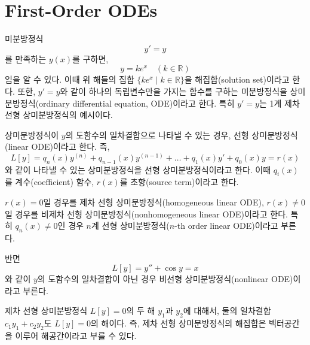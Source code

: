 \documentclass[../engineering_mathematics_lecture_note.tex]{subfiles}
\begin{document}
\section{First-Order ODEs}
미분방정식
\begin{equation*}
    y' = y
\end{equation*}
를 만족하는 $y(x)$를 구하면,
\begin{equation*}
    y = ke^x \quad (k \in \mathbb R)
\end{equation*}
임을 알 수 있다.
이때 위 해들의 집합 $\{ke^x \mid k \in \mathbb R\}$을 해집합(solution set)이라고 한다.
또한, $y' = y$와 같이 하나의 독립변수만을 가지는 함수를 구하는 미분방정식을 상미분방정식(ordinary differential equation, ODE)이라고 한다.
특히 $y' = y$는 1계 제차 선형 상미분방정식의 예시이다.

\begin{definition}
    상미분방정식이 $y$의 도함수의 일차결합으로 나타낼 수 있는 경우, 선형 상미분방정식(linear ODE)이라고 한다.
    즉,
    \begin{equation*}
        L[y] = q_n(x) y^{(n)} + q_{n - 1}(x) y^{(n - 1)} + \dots + q_1(x) y' + q_0(x) y = r(x)
    \end{equation*}
    와 같이 나타낼 수 있는 상미분방정식을 선형 상미분방정식이라고 한다.
    이때 $q_i(x)$를 계수(coefficient) 함수, $r(x)$를 초항(source term)이라고 한다.

    $r(x) = 0$일 경우를 제차 선형 상미분방정식(homogeneous linear ODE), $r(x) \neq 0$일 경우를 비제차 선형 상미분방정식(nonhomogeneous linear ODE)이라고 한다.
    특히 $q_n(x) \neq 0$인 경우 $n$계 선형 상미분방정식($n$-th order linear ODE)이라고 부른다.

    반면
    \begin{equation*}
        L[y] = y'' + \cos y = x
    \end{equation*}
    와 같이 $y$의 도함수의 일차결합이 아닌 경우 비선형 상미분방정식(nonlinear ODE)이라고 부른다.
\end{definition}

\begin{theorem}
    제차 선형 상미분방정식 $L[y] = 0$의 두 해 $y_1$과 $y_2$에 대해서, 둘의 일차결합 $c_1 y_1 + c_2 y_2$도 $L[y] = 0$의 해이다.
    즉, 제차 선형 상미분방정식의 해집합은 벡터공간을 이루어 해공간이라고 부를 수 있다.
\end{theorem}
\end{document}
